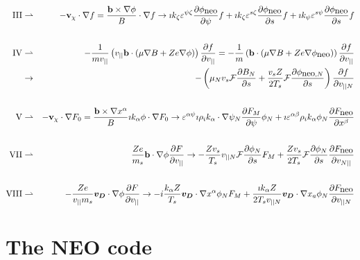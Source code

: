 \begin{eqnarray}
{\rm III} &\rightharpoonup& - {\bf v}_\chi \cdot \nabla f =  \frac{{\bf b}\times\nabla\phi}{B}\cdot\nabla{f} \rightarrow 
\imath k_{\zeta}\varepsilon^{\psi\zeta} \frac{\partial\phi_{\mbox{neo}}}{\partial\psi} f + \imath k_{\zeta}\varepsilon^{s\zeta} \frac{\partial\phi_{\mbox{neo}}}{\partial s} f + \imath k_{\psi}\varepsilon^{s\psi} \frac{\partial\phi_{\mbox{neo}}}{\partial s} f \nonumber\\
\noalign{\vskip 0.6 truecm}
{\rm IV} &\rightharpoonup& -\frac{1}{mv_{||}}\left(v_{||}{\bf b}\cdot\left(\mu\nabla B + Ze\nabla\phi\right)\right)\frac{\partial f}{\partial v_{||}} 
= -\frac{1}{m}\left({\bf b}\cdot\left(\mu\nabla B + Ze\nabla\phi_{\mbox{neo}}\right)\right)\frac{\partial f}{\partial v_{||}} \nonumber\\ &\rightarrow& -\left(\mu_{N}v_{s}\mathcal{F} \frac{\partial B_{N}}{\partial s} + \frac{v_{s}Z}{2T_{s}}\mathcal{F}\frac{\partial\phi_{\mbox{neo},N}}{\partial s}\right)\frac{\partial f}{\partial v_{|| N}}\nonumber\\
\noalign{\vskip 0.6 truecm}
{\rm V} &\rightharpoonup& - {\bf v}_\chi \cdot \nabla F_0 =\frac{{\bf b}\times\nabla x^{\alpha}}{B}\imath k_{\alpha}\phi\cdot\nabla F_0 \rightarrow
\varepsilon^{\alpha\psi}\imath \rho_{i}k_{\alpha}\cdot\nabla\psi_{N} \frac{\partial F_{M}}{\partial\psi}\phi_{N} + \imath\varepsilon^{\alpha\beta} \rho_{i}k_{\alpha}\phi_{N}\frac{\partial F_{\mbox{neo}}}{\partial x^{\beta}}\nonumber\\
\noalign{\vskip 0.6 truecm}
{\rm VII} &\rightharpoonup& \frac{Ze}{m_{s}} {\bf b}\cdot\nabla\phi \frac{\partial F}{\partial v_{||}}  \rightarrow -\frac{Zv_{s}}{T_{s}} v_{||N} \mathcal{F}\frac{\partial\phi_{N}}{\partial s} F_{M} + \frac{Zv_{s}}{2T_{s}} \mathcal{F}\frac{\partial\phi_{N}}{\partial s} \frac{\partial F_{\mbox{neo}}}{\partial v_{N||}} \nonumber\\
\noalign{\vskip 0.6 truecm}
{\rm VIII} &\rightharpoonup& -\frac{Ze}{v_{||}m_{s}} \vec{v_{D}}\cdot\nabla\phi \frac{\partial F}{\partial v_{||}} \rightarrow-i\frac{k_{\alpha}Z}{T_{s}}\vec{v_{D}}\cdot\nabla x^{\alpha}\phi_{N}F_{M}+\frac{\imath k_{\alpha}Z}{2T_{s}v_{||N}} \vec{v_{D}}\cdot\nabla x_{a}\phi_{N} \frac{\partial F_{\mbox{neo}}}{\partial v_{||N}}\nonumber\\
\end{eqnarray}

\section{The NEO code}

